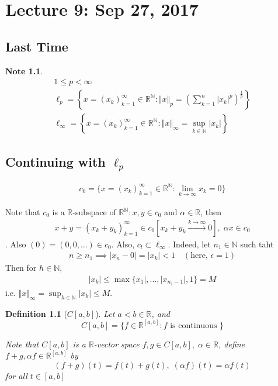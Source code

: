 \documentclass[11pt, oneside]{book}
\theoremstyle{break}
\newtheorem*{note}{Note}
\newtheorem{defn}{Definition}[section]
\newcommand{\bb}[1]{\mathbb{#1}}			%
\begin{document}
\chapter{Lecture 9: Sep 27, 2017}\label{chp:lec9}

\section{Last Time}

\begin{note}
	\begin{gather*}
		1 \leq p < \infty \\
		\ell_p = \left\{x = (x_k)_{k = 1}^\infty \in \bb{R}^\bb{N} : \Vert x\Vert _p = \left(\sum_{k=1}^{n} |x_k|^p \right)^{\frac{1}{p}} \right\} \\
		\ell_\infty = \left\{ x = (x_k)_{k = 1}^\infty \in \bb{R}^\bb{N} : \Vert x\Vert _\infty = \sup_{k \in \bb{N}}|x_k| \right\}
	\end{gather*}
\end{note}

\section{Continuing with \texorpdfstring{$\ell_p$}{lp}}\label{sect:l_p space cont}

\begin{gather*}
	c_0 = \{x = (x_k)_{k = 1}^\infty \in \bb{R}^\bb{N} : \lim_{k \to \infty} x_k = 0 \}
\end{gather*}

Note that $c_0$  is a $\bb{R}$-subspace of $\bb{R}^\bb{N} : x, y \in c_0$ and $\alpha \in \bb{R}$, then
\begin{gather*}
	x + y = (x_k + y_k)_{k = 1}^\infty \in c_0 \left[ x_k + y_k \overset{k \to \infty}{\to} 0 \right], \; \alpha x \in c_0
\end{gather*}.
Also $(0) = (0, 0, ... ) \in c_0$. Also, $c_l \subset \ell_\infty$. Indeed, let $n_1 \in \bb{N}$ such taht
\begin{gather*}
	n \geq n_1 \implies |x_n - 0| = |x_k| < 1 \quad (\text{here, } \epsilon = 1)
\end{gather*}
Then for $h \in \bb{N}$,
\begin{gather*}
	|x_k| \leq \max\{x_1|, ..., |x_{n_1 - 1}|, 1 \} = M
\end{gather*}
i.e. $\Vert x\Vert _\infty = \sup_{h \in \bb{N}} |x_k| \leq M$.

\begin{defn}[\texorpdfstring{$C[a, b]$}{}]
	Let $a < b \in \bb{R}$, and
	\begin{equation}
		C[a, b] = \{f \in \bb{R}^{[a,b]} : f \text{ is continuous } \}
	\end{equation}

	Note that $C[a, b]$ is a $\bb{R}$-vector space $f, g \in C[a, b], \; \alpha \in \bb{R}$, define $f + g, \alpha f \in \bb{R}^{[a,b]}$ by
	\begin{equation}
		(f+g)(t) = f(t) + g(t), \; (\alpha f)(t) = \alpha f(t)
	\end{equation}
	for all $t \in [a, b]$
\end{defn}
\end{document}
